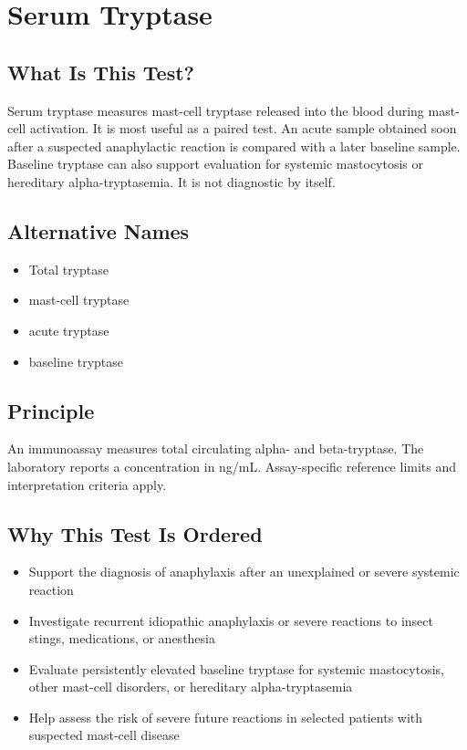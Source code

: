 \chapter{Serum Tryptase}

\section*{What Is This Test?}
Serum tryptase measures mast-cell tryptase released into the blood during mast-cell activation. It is most useful as a paired test. An acute sample obtained soon after a suspected anaphylactic reaction is compared with a later baseline sample. Baseline tryptase can also support evaluation for systemic mastocytosis or hereditary alpha-tryptasemia. It is not diagnostic by itself.

\section*{Alternative Names}
\begin{itemize}
  \item Total tryptase
  \item mast-cell tryptase
  \item acute tryptase
  \item baseline tryptase
\end{itemize}
\section*{Principle}
An immunoassay measures total circulating alpha- and beta-tryptase. The laboratory reports a concentration in ng/mL. Assay-specific reference limits and interpretation criteria apply.

\section*{Why This Test Is Ordered}
\begin{itemize}
  \item Support the diagnosis of anaphylaxis after an unexplained or severe systemic reaction
  \item Investigate recurrent idiopathic anaphylaxis or severe reactions to insect stings, medications, or anesthesia
  \item Evaluate persistently elevated baseline tryptase for systemic mastocytosis, other mast-cell disorders, or hereditary alpha-tryptasemia
  \item Help assess the risk of severe future reactions in selected patients with suspected mast-cell disease
\end{itemize}

